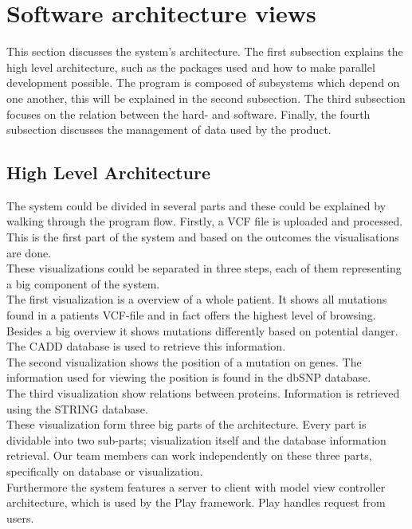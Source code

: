 \section{Software architecture views}
	This section discusses the system's architecture. The first subsection explains the high level architecture, such as the packages used and how to make parallel development possible. The program is composed of subsystems which depend on one another, this will be explained in the second subsection. The third subsection focuses on the relation between the hard- and software. Finally, the fourth subsection discusses the management of data used by the product.
	\subsection{High Level Architecture}
		The system could be divided in several parts and these could be explained by walking through the program flow. Firstly, a VCF file is uploaded and processed. This is the first part of the system and based on the outcomes the visualisations are done.\\
		These visualizations could be separated in three steps, each of them representing a big component of the system.\\		
		The first visualization is a overview of a whole patient. It shows all mutations found in a patients VCF-file and in fact offers the highest level of browsing. Besides a big overview it shows mutations differently based on potential danger. The CADD database is used to retrieve this information.\\		
		The second visualization shows the position of a mutation on genes. The information used for viewing the position is found in the dbSNP database.\\
		The third visualization show relations between proteins. Information is retrieved using the STRING database.\\		
		These visualization form three big parts of the architecture. Every part is dividable into two sub-parts; visualization itself and the database information retrieval. Our team members can work independently on these three parts, specifically on database or visualization.\\		
		Furthermore the system features a server to client with model view controller architecture, which is used by the Play framework. Play handles request from users.
